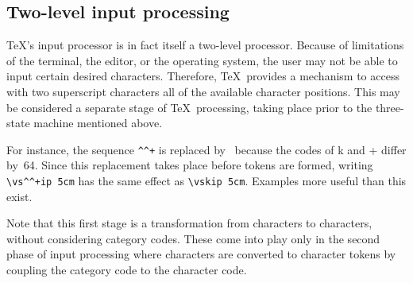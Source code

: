 \documentclass{book}
\begin{document}
\subsection{Two-level input processing}

\TeX's input processor is in fact itself a two-level processor.
Because of limitations of the terminal, the editor, or the operating
system, the user may not be able to input certain desired characters.
Therefore, \TeX\ provides a mechanism to access
with two superscript characters all of the available character
positions. This may be considered
a separate stage of \TeX\ processing, taking place
prior to the three-state machine mentioned above.

For instance, the sequence \verb>^^+> is replaced by~ because
the \ascii{} codes of \n k and \n + differ by~64. 
Since this replacement takes place before tokens are formed,
writing \verb>\vs^^+ip 5cm> has the same effect as
\verb>\vskip 5cm>. Examples more useful than this exist.

Note that this first stage is a transformation from
characters to characters, without considering category
codes. These come into play only in the second phase
of input processing where characters are converted
to character tokens by coupling the category code
to the character code.

\end{document}
